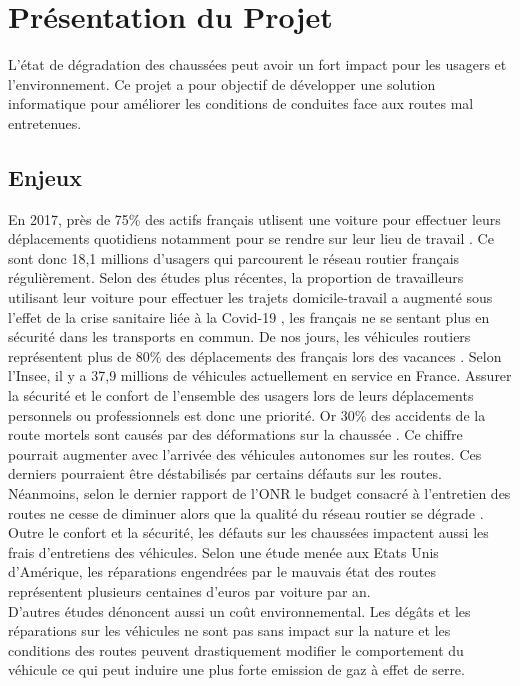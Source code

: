 \section{Présentation du Projet}
L'état de dégradation des chaussées peut avoir un fort impact pour les usagers
et l'environnement. Ce projet a pour objectif de développer une solution
informatique pour améliorer les conditions de conduites face aux routes mal
entretenues.

\subsection{Enjeux}
En 2017, près de 75\% des actifs français utlisent une voiture pour effectuer
leurs
déplacements quotidiens notamment pour se rendre sur leur lieu de travail
\cite{insee}. Ce sont donc 18,1 millions d'usagers qui parcourent le réseau
routier français régulièrement. Selon des études plus récentes, la proportion
de travailleurs utilisant leur voiture pour effectuer les trajets
domicile-travail a augmenté sous l'effet de la crise sanitaire liée à la
Covid-19 \cite{covid}, les français ne se sentant plus en sécurité dans les
transports en commun.
De nos jours, les véhicules routiers représentent plus de 80\% des
déplacements des français lors des vacances \cite{vacances}.
Selon l'Insee, il y a 37,9 millions de véhicules actuellement en service en
France.
Assurer la sécurité et le confort de l'ensemble des usagers lors de leurs
déplacements personnels ou professionnels est donc une priorité. Or 30\% des
accidents de la route mortels sont causés par des déformations sur la chaussée
\cite{europe1}. Ce chiffre pourrait augmenter avec l'arrivée des véhicules
autonomes sur les routes. Ces derniers pourraient être déstabilisés par
certains défauts sur les routes.
Néanmoins, selon le dernier rapport de l'ONR le budget consacré à l'entretien
des routes ne cesse de diminuer \cite{onr} alors que la qualité du réseau
routier se dégrade \cite{tf1}.\\

Outre le confort et la sécurité, les défauts sur les chaussées impactent aussi
les frais d'entretiens des véhicules. Selon une étude menée aux Etats Unis
d'Amérique, les réparations engendrées par le mauvais état des routes
représentent plusieurs centaines d'euros par voiture par an.\\

D'autres études dénoncent aussi un coût environnemental. Les dégâts et les
réparations sur les véhicules ne sont pas sans impact sur la nature
\cite{pneus} et les conditions des routes peuvent drastiquement modifier le
comportement du véhicule ce qui peut induire une plus forte emission de gaz à
effet de serre.\\

